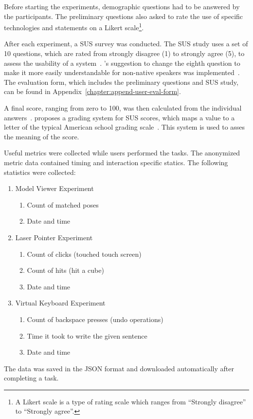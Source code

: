 Before starting the experiments, demographic questions had to be answered by the participants. The preliminary questions also asked to rate the use of specific technologies and statements on a Likert scale\footnote{A Likert scale is a type of rating scale which ranges from \enquote{Strongly disagree} to \enquote{Strongly agree}.}. 

After each experiment, a \gls{SUS} survey was conducted. The \gls{SUS} study uses a set of 10 questions, which are rated from strongly disagree (1) to strongly agree (5), to assess the usability of a system~\cite[3]{Brooke.1996}. \citeauthor{Finstad.2006}'s suggestion to change the eighth question to make it more easily understandable for non-native speakers was implemented~\cite[188]{Finstad.2006}. The evaluation form, which includes the preliminary questions and \gls{SUS} study, can be found in Appendix~\ref{chapter:append-user-eval-form}.

A final score, ranging from zero to 100, was then calculated from the individual answers~\cite{Brooke.1996}. \citeauthor{Bangor.2009} proposes a grading system for \gls{SUS} scores, which maps a value to a letter of the typical American school grading scale~\cite{Bangor.2009}. This system is used to asses the meaning of the score.

Useful metrics were collected while users performed the tasks. The anonymized metric data contained timing and interaction specific statics. The following statistics were collected:
\begin{enumerate}
  \item Model Viewer Experiment
  \begin{enumerate}
    \item Count of matched poses
    \item Date and time
  \end{enumerate}

  \item Laser Pointer Experiment
  \begin{enumerate}
    \item Count of clicks (touched touch screen)
    \item Count of hits (hit a cube)
    \item Date and time
  \end{enumerate}
  
  \item Virtual Keyboard Experiment
  \begin{enumerate}
    \item Count of backspace presses (undo operations)
    \item Time it took to write the given sentence
    \item Date and time
  \end{enumerate}
\end{enumerate}
The data was saved in the JSON format and downloaded automatically after completing a task.